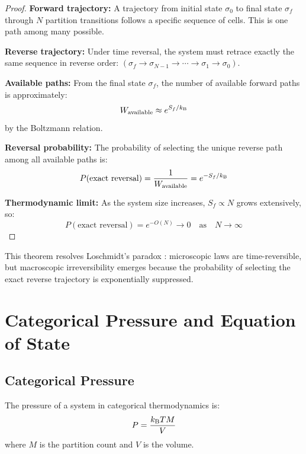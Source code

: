 \begin{proof}
\textbf{Forward trajectory:} A trajectory from initial state $\sigma_0$ to final state $\sigma_f$ through $N$ partition transitions follows a specific sequence of cells. This is one path among many possible.

\textbf{Reverse trajectory:} Under time reversal, the system must retrace exactly the same sequence in reverse order: $(\sigma_f \to \sigma_{N-1} \to \cdots \to \sigma_1 \to \sigma_0)$.

\textbf{Available paths:} From the final state $\sigma_f$, the number of available forward paths is approximately:
\begin{equation}
W_{\text{available}} \approx e^{S_f/k_{\mathrm{B}}}
\end{equation}
by the Boltzmann relation.

\textbf{Reversal probability:} The probability of selecting the unique reverse path among all available paths is:
\begin{equation}
P(\text{exact reversal}) = \frac{1}{W_{\text{available}}} = e^{-S_f/k_{\mathrm{B}}}
\end{equation}

\textbf{Thermodynamic limit:} As the system size increases, $S_f \propto N$ grows extensively, so:
\begin{equation}
P(\text{exact reversal}) = e^{-O(N)} \to 0 \quad \text{as} \quad N \to \infty
\end{equation}
\end{proof}

This theorem resolves Loschmidt's paradox \cite{loschmidt1876}: microscopic laws are time-reversible, but macroscopic irreversibility emerges because the probability of selecting the exact reverse trajectory is exponentially suppressed.

\section{Categorical Pressure and Equation of State}

\subsection{Categorical Pressure}

\begin{theorem}
\label{thm:pressure}
The pressure of a system in categorical thermodynamics is:
\begin{equation}
P = \frac{k_{\mathrm{B}} T M}{V}
\label{eq:categorical_pressure}
\end{equation}
where $M$ is the partition count and $V$ is the volume.
\end{theorem}

